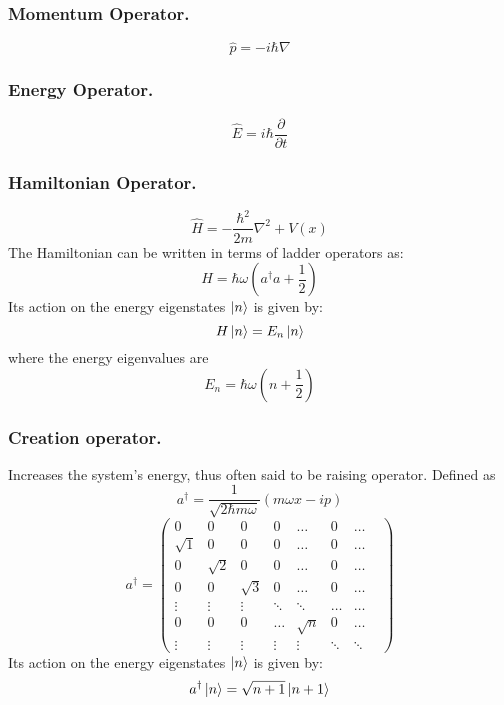\documentclass[../../../main.tex]{subfiles}
\begin{document}
\subsubsection*{Momentum Operator.} 
\begin{equation*}
    \hat{p}= -i\hbar\nabla
\end{equation*}

\subsubsection*{Energy Operator.} 
\begin{equation*}
    \hat{E}=i \hbar \frac{\partial}{\partial t}
\end{equation*}

\subsubsection*{Hamiltonian Operator.}
\begin{equation*}
    \hat{H}=-\frac{\hbar^2}{2m}\nabla^2 +V(x)
\end{equation*}
The Hamiltonian can be written in terms of ladder operators as:
\begin{equation*}
H = \hbar\omega \left( a^\dagger a + \frac{1}{2} \right)
\end{equation*}
Its action on the energy eigenstates $\ket{n}$ is given by:
\begin{equation*}
    H \ket{n} = E_n\ket{n}
\end{equation*}
where the energy eigenvalues are
\begin{equation*}
    E_n=\hbar\omega\left(n+\frac{1}{2}\right)
\end{equation*}

\subsubsection*{Creation operator.} Increases the system's energy, thus often said to be raising operator. Defined as 
\begin{equation*}
    a^\dagger = \frac{1}{\sqrt{2\hbar m \omega}} \left( m\omega x - i p \right)
\end{equation*}
\begin{equation*}
    a^\dagger=\begin{pmatrix}
    0 & 0 & 0 & 0 & \dots & 0 & \dots \\
    \sqrt{1} & 0 & 0 & 0 & \dots & 0 & \dots \\
    0 & \sqrt{2} & 0 & 0 & \dots & 0 & \dots \\
    0 & 0 & \sqrt{3} & 0 & \dots & 0 & \dots \\
    \vdots & \vdots & \vdots & \ddots & \ddots & \dots & \dots \\
    0 & 0 & 0 & \dots & \sqrt{n} & 0 & \dots & \\
    \vdots & \vdots & \vdots & \vdots & \vdots & \ddots & \ddots 
\end{pmatrix}
\end{equation*}
Its action on the energy eigenstates $\ket{n}$ is given by:
\begin{equation*}
a^\dagger \ket{n} = \sqrt{n+1} \ket{n+1}
\end{equation*}
\end{document}
